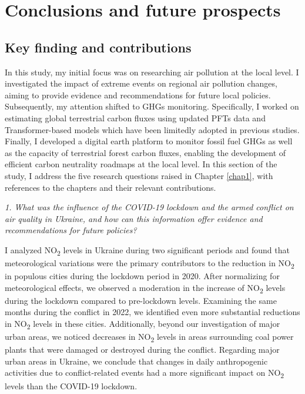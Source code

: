 \chapter{Conclusions and future prospects} \label{chap6}
\section{Key finding and contributions}
In this study, my initial focus was on researching air pollution at the local level. I investigated the impact of extreme events on regional air pollution changes, aiming to provide evidence and recommendations for future local policies. Subsequently, my attention shifted to GHGs monitoring. Specifically, I worked on estimating global terrestrial carbon fluxes using updated PFTs data and Transformer-based models which have been limitedly adopted in previous studies. Finally, I developed a digital earth platform to monitor fossil fuel GHGs as well as the capacity of terrestrial forest carbon fluxes, enabling the development of efficient carbon neutrality roadmaps at the local level. In this section of the study, I address the five research questions raised in Chapter \ref{chap1}, with references to the chapters and their relevant contributions. \par

\textit{1. What was the influence of the COVID-19 lockdown and the armed conflict on air quality in Ukraine, and how can this information offer evidence and recommendations for future policies?} \par
I analyzed NO\textsubscript{2} levels in Ukraine during two significant periods and found that meteorological variations were the primary contributors to the reduction in NO\textsubscript{2} in populous cities during the lockdown period in 2020. After normalizing for meteorological effects, we observed a moderation in the increase of NO\textsubscript{2} levels during the lockdown compared to pre-lockdown levels. Examining the same months during the conflict in 2022, we identified even more substantial reductions in NO\textsubscript{2} levels in these cities. Additionally, beyond our investigation of major urban areas, we noticed decreases in NO\textsubscript{2} levels in areas surrounding coal power plants that were damaged or destroyed during the conflict. Regarding major urban areas in Ukraine, we conclude that changes in daily anthropogenic activities due to conflict-related events had a more significant impact on NO\textsubscript{2} levels than the COVID-19 lockdown. \par

